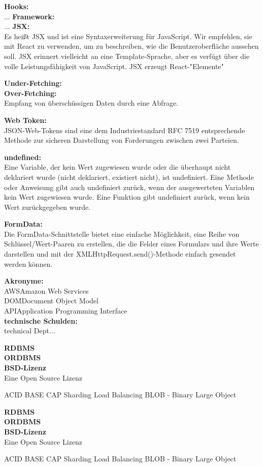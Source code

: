 

\textbf{Hooks:}\\
...
\textbf{Framework:}\\
...
\textbf{JSX:}\\
Es heißt JSX und ist eine Syntaxerweiterung für JavaScript. Wir empfehlen, sie mit React zu verwenden, um zu beschreiben, wie die Benutzeroberfläche aussehen soll. JSX erinnert vielleicht an eine Template-Sprache, aber es verfügt über die volle Leistungsfähigkeit von JavaScript. JSX erzeugt React-"Elemente"

\textbf{Under-Fetching:}\\

\textbf{Over-Fetching:}\\
Empfang von überschüssigen Daten durch eine Abfrage.

\textbf{Web Token:}\\
JSON-Web-Tokens sind eine dem Industriestandard RFC 7519 entsprechende Methode zur sicheren Darstellung von Forderungen zwischen zwei Parteien.

\textbf{undefined:}\\
Eine Variable, der kein Wert zugewiesen wurde oder die überhaupt nicht deklariert wurde (nicht deklariert, existiert nicht), ist undefiniert. Eine Methode oder Anweisung gibt auch undefiniert zurück, wenn der ausgewerteten Variablen kein Wert zugewiesen wurde. Eine Funktion gibt undefiniert zurück, wenn kein Wert zurückgegeben wurde.

\textbf{FormData:}\\
Die FormData-Schnittstelle bietet eine einfache Möglichkeit, eine Reihe von Schlüssel/Wert-Paaren zu erstellen, die die Felder eines Formulars und ihre Werte darstellen und mit der XMLHttpRequest.send()-Methode einfach gesendet werden können.

\textbf{Akronyme:}\\

{AWS}{Amazon Web Services}\\
{DOM}{Document Object Model}\\
{API}{Application Programming Interface}\\

\textbf{technische Schulden:}\\
technical Dept...

\textbf{RDBMS}\\
\textbf{ORDBMS}\\
\textbf{BSD-Lizenz}\\
Eine Open Source Lizenz

ACID
BASE
CAP
Sharding
Load Balancing
BLOB - Binary Large Object

\textbf{RDBMS}\\
\textbf{ORDBMS}\\
\textbf{BSD-Lizenz}\\
Eine Open Source Lizenz

ACID
BASE
CAP
Sharding
Load Balancing
BLOB - Binary Large Object

